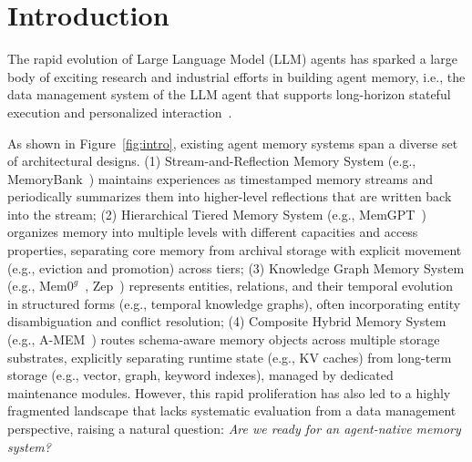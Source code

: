 \section{Introduction}
\label{sec:intro}

The rapid evolution of Large Language Model (LLM) agents has sparked a large body of exciting research and industrial efforts in building agent memory, i.e., the data management system of the LLM agent that supports long-horizon stateful execution and personalized interaction~\cite{luo2026data,khan2026rag,liu2026supporting,singh2024personal,openai2026agents,microsoft2025copilot,google2025adk}. 

As shown in Figure~\ref{fig:intro}, existing agent memory systems span a diverse set of architectural designs. %
\textsf{(1) Stream-and-Reflection Memory System} (e.g., MemoryBank~\cite{memorybank}) maintains experiences as timestamped memory streams and periodically summarizes them into higher-level reflections that are written back into the stream; 
\textsf{(2) Hierarchical Tiered Memory System} (e.g., MemGPT~\cite{packer2023memgpt}) organizes memory into multiple levels with different capacities and access properties, separating core memory from archival storage with explicit movement (e.g., eviction and promotion) across tiers; 
\textsf{(3) Knowledge Graph Memory System} (e.g., $\text{Mem0}^g$~\cite{chhikara2025mem0}, Zep~\cite{rasmussen2025zep}) represents entities, relations, and their temporal evolution in structured forms (e.g., temporal knowledge graphs), often incorporating entity disambiguation and conflict resolution; \textsf{(4) Composite Hybrid Memory System} (e.g., A-MEM~\cite{xu2025amem}) routes schema-aware memory objects across multiple storage substrates, explicitly separating runtime state (e.g., KV caches) from long-term storage (e.g., vector, graph, keyword indexes), managed by dedicated maintenance modules. However, this rapid proliferation has also led to a highly fragmented landscape that lacks systematic evaluation from a data management perspective, raising a natural question: \textit{Are we ready for an agent-native memory system?}


